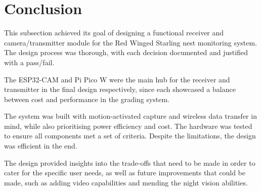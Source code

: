 \documentclass[class=report,11pt,crop=false]{standalone}
\begin{document}
\section{Conclusion}
This subsection achieved its goal of designing a functional receiver and camera/transmitter module for the Red Winged Starling nest monitoring system. The design process was thorough, with each decision documented and justified with a pass/fail. 

The ESP32-CAM and Pi Pico W were the main hub for the receiver and transmitter in the final design respectively, since each showcased a balance between cost and performance in the grading system. 

The system was built with motion-activated capture and wireless data transfer in mind, while also prioritising power efficiency and cost. The hardware was tested to ensure all components met a set of criteria. Despite the limitations, the design was efficient in the end. 

The design provided insights into the trade-offs that need to be made in order to cater for the specific user needs, as well as future improvements that could be made, such as adding video capabilities and mending the night vision abilities. 

\ifstandalone

\printnoidxglossary[type=\acronymtype,nonumberlist]
\fi
\end{document}
